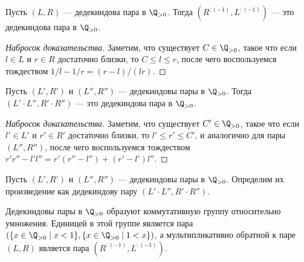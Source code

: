 \documentclass[
	extrafontsizes,
	11pt,
	hyphens,
]{memoir}
\begin{document}
\begin{lemma}
Пусть \((L,R)\) --- дедекиндова пара в \(\Q_{>0}\).
\label{lem:DedPairInv}
Тогда \((R^{:(-1)}, L^{:(-1)})\)
--- это дедекиндова пара в \(\Q_{>0}\).
\end{lemma}

\begin{proof}[Набросок доказательства]
Заметим, что существует \(C \in \Q_{>0}\), такое что если \(l \in L\) и \(r \in R\) достаточно близки, то \(C \leq l \leq r\),
после чего воспользуемся тождеством
\(1/l - 1/r = (r-l)/(lr)\).
\end{proof}

\begin{lemma}
\label{lem:DedPairProd}
Пусть \((L',R')\) и \((L'',R'')\) --- дедекиндовы пары в \(\Q_{>0}\).
Тогда \((L' \cdot L'', R' \cdot R'')\)
--- это дедекиндова пара в \(\Q_{>0}\).
\end{lemma}

\begin{proof}[Набросок доказательства]
Заметим, что существует \(C' \in \Q_{>0}\), такое что если \(l' \in L'\) и \(r' \in R'\) достаточно близки, то \(l' \leq r' \leq C'\), и аналогично для пары \((L'',R'')\),
после чего воспользуемся тождеством
\(
r' r'' - l' l'' =
r' (r'' - l'') +
(r' - l') l''
\).
\end{proof}

\begin{definition}
Пусть \((L',R')\) и \((L'',R'')\) --- дедекиндовы пары в \(\Q_{>0}\).
Определим их произведение как дедекиндову пару
\((L' \cdot L'', R' \cdot R'')\).
\end{definition}

\begin{observation}
\label{obs:DedPairMultGr}
Дедекиндовы пары в \(\Q_{>0}\) образуют коммутативную группу относительно умножения.
Единицей в этой группе является пара
\((\{x \in \Q_{>0} \mid x < 1\}, \{x \in \Q_{>0} \mid 1 < x\})\),
а мультипликативно обратной к паре \((L,R)\) является пара \((R^{:(-1)}, L^{:(-1)})\).
\end{observation}
\end{document}
